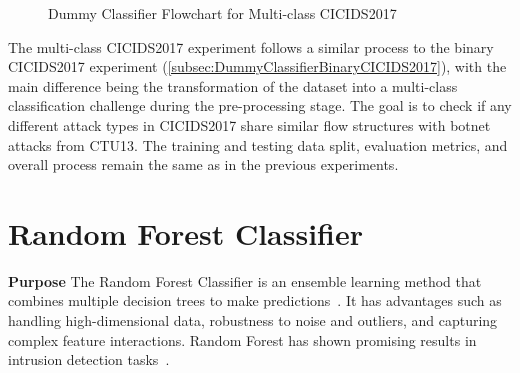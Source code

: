 \begin{figure}[H]
\centering
{}
\caption{Dummy Classifier Flowchart for Multi-class CICIDS2017}\label{fig:DummyRandomFlowMultiCICIDS2017}
\end{figure}

The multi-class CICIDS2017 experiment follows a similar process to the binary CICIDS2017 experiment (\ref{subsec:DummyClassifierBinaryCICIDS2017}), with the main difference being the transformation of the dataset into a multi-class classification challenge during the pre-processing stage. The goal is to check if any different attack types in CICIDS2017 share similar flow structures with botnet attacks from CTU13. The training and testing data split, evaluation metrics, and overall process remain the same as in the previous experiments.

\section{Random Forest Classifier}\label{sec:RandomForestClassifier}

\textbf{Purpose} The Random Forest Classifier is an ensemble learning method that combines multiple decision trees to make predictions~\cite{hastie2009random}. It has advantages such as handling high-dimensional data, robustness to noise and outliers, and capturing complex feature interactions. Random Forest has shown promising results in intrusion detection tasks~\cite{farnaaz2016random, belouch2018performance}.

